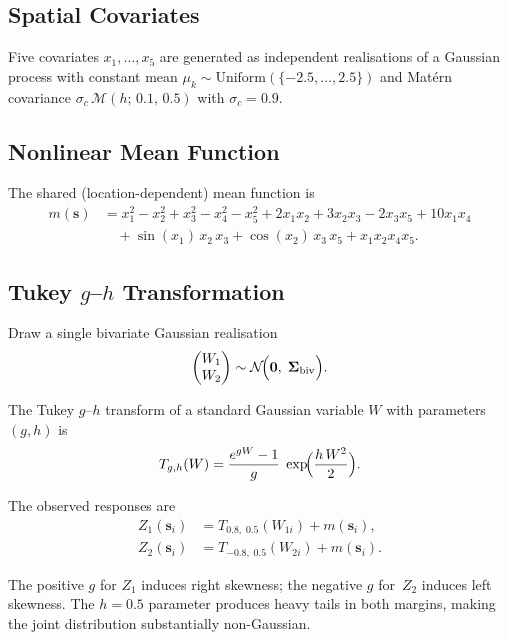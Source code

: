 \documentclass[11pt,a4paper]{article}
\newcommand{\bs}{\bm{s}}
\newcommand{\bSigma}{\bm{\Sigma}}
\begin{document}
\subsection{Spatial Covariates}

Five covariates $x_1,\dots,x_5$ are generated as independent realisations of a
Gaussian process with constant mean
$\mu_k \sim \text{Uniform}(\{-2.5,\dots,2.5\})$ and Mat\'ern covariance
$\sigma_c\,\mathcal{M}(h;\,0.1,\,0.5)$ with $\sigma_c=0.9$.

\subsection{Nonlinear Mean Function}

The shared (location-dependent) mean function is
\begin{equation}\label{eq:mean}
\begin{aligned}
  m(\bs) &= x_1^2 - x_2^2 + x_3^2 - x_4^2 - x_5^2
           + 2x_1 x_2 + 3x_2 x_3 - 2x_3 x_5 + 10 x_1 x_4 \\
         &\quad + \sin(x_1)\,x_2\,x_3
           + \cos(x_2)\,x_3\,x_5
           + x_1 x_2 x_4 x_5.
\end{aligned}
\end{equation}

\subsection{Tukey $g$--$h$ Transformation}

Draw a single bivariate Gaussian realisation
\[
  \begin{pmatrix} W_1 \\ W_2 \end{pmatrix}
  \sim \mathcal{N}\!\Bigl(\bm{0},\;\bSigma_{\text{biv}}\Bigr).
\]

The Tukey $g$--$h$ transform of a standard Gaussian variable $W$ with
parameters $(g,h)$ is
\begin{equation}\label{eq:tukey}
  T_{g,h}(W) = \frac{e^{gW}-1}{g}\;\exp\!\Bigl(\frac{h\,W^2}{2}\Bigr).
\end{equation}

The observed responses are
\begin{align}
  Z_1(\bs_i) &= T_{0.8,\;0.5}(W_{1i}) + m(\bs_i), \\
  Z_2(\bs_i) &= T_{-0.8,\;0.5}(W_{2i}) + m(\bs_i).
\end{align}

\noindent
The positive $g$ for $Z_1$ induces right skewness; the negative $g$ for~$Z_2$
induces left skewness.  The $h=0.5$ parameter produces heavy tails in both
margins, making the joint distribution substantially non-Gaussian.
\end{document}
